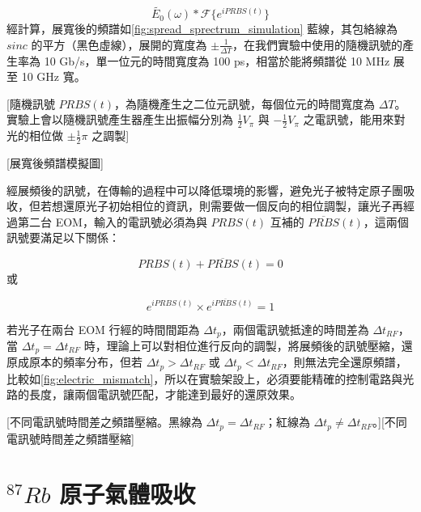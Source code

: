 \documentclass[class=NCU_thesis, crop=false]{standalone}
\begin{document}
\begin{equation}
    \tilde{E_{0}}(\omega)*\mathscr{F}\{{e^{i PRBS(t)}}\}
\end{equation}
經計算，展寬後的頻譜如\cref{fig:spread_sprectrum_simulation} 藍線，其包絡線為 $sinc$ 的平方（黑色虛線），展開的寬度為 $\pm\frac{1}{\Delta T}$，在我們實驗中使用的隨機訊號的產生率為 10 Gb/s，單一位元的時間寬度為 100 ps，相當於能將頻譜從 10 MHz 展至 10 GHz 寬。

[隨機訊號 $PRBS(t)$，為隨機產生之二位元訊號，每個位元的時間寬度為 $\Delta T$。實驗上會以隨機訊號產生器產生出振幅分別為 $\frac{1}{2}V_\pi$ 與 $-\frac{1}{2}V_\pi$ 之電訊號，能用來對光的相位做 $\pm \frac{1}{2}\pi$ 之調製] 

[展寬後頻譜模擬圖]

經展頻後的訊號，在傳輸的過程中可以降低環境的影響，避免光子被特定原子團吸收，但若想還原光子初始相位的資訊，則需要做一個反向的相位調製，讓光子再經過第二台 EOM，輸入的電訊號必須為與 $PRBS(t)$ 互補的 $\overline{PRBS}(t)$，這兩個訊號要滿足以下關係：

\begin{equation}
    \label{eq:prbs_condition}
    PRBS(t)+\overline{PRBS}(t)=0
\end{equation}
或

\begin{equation}
    e^{i PRBS(t)}\times e^{i \overline{PRBS}(t)}=1
\end{equation}

若光子在兩台 EOM 行經的時間間距為 $\Delta t_{p}$，兩個電訊號抵達的時間差為 $\Delta t_{RF}$，當 $\Delta t_{p}=\Delta t_{RF}$ 時，理論上可以對相位進行反向的調製，將展頻後的訊號壓縮，還原成原本的頻率分布，但若 $\Delta t_{p}>\Delta t_{RF}$ 或 $\Delta t_{p}<\Delta t_{RF}$，則無法完全還原頻譜，比較如\cref{fig:electric_mismatch}，所以在實驗架設上，必須要能精確的控制電路與光路的長度，讓兩個電訊號匹配，才能達到最好的還原效果。


[不同電訊號時間差之頻譜壓縮。黑線為 $\Delta t_{p}=\Delta t_{RF}$；紅線為 $\Delta t_{p} \neq \Delta t_{RF}$。][不同電訊號時間差之頻譜壓縮]

\section{$^{87}Rb$ 原子氣體吸收}
\end{document}
